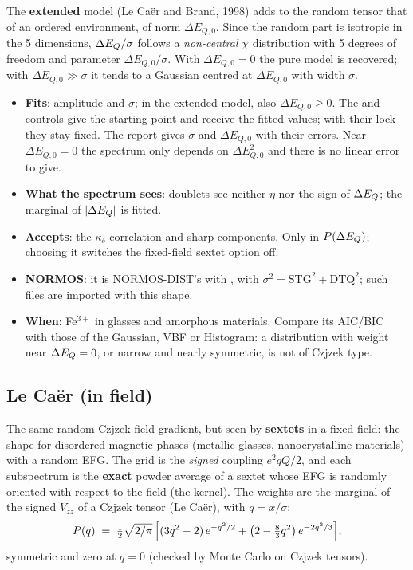 The \textbf{extended} model (Le Caër and Brand, 1998) adds to the random tensor
that of an ordered environment, of norm $\Delta E_{Q,0}$. Since the random part is
isotropic in the 5 dimensions, $\Delta E_{Q}/\sigma$ follows a \emph{non-central} $\chi$
distribution with 5 degrees of freedom and parameter $\Delta E_{Q,0}/\sigma$. With
$\Delta E_{Q,0}=0$ the pure model is recovered; with $\Delta E_{Q,0}\gg\sigma$ it tends to a
Gaussian centred at $\Delta E_{Q,0}$ with width $\sigma$.

\begin{itemize}[nosep]
  \item \textbf{Fits}: amplitude and $\sigma$; in the extended model, also
        $\Delta E_{Q,0}\ge 0$. The  and 
        controls give the starting point and receive the fitted values; with
        their lock they stay fixed. The report gives $\sigma$ and $\Delta E_{Q,0}$ with their
        errors. Near $\Delta E_{Q,0}=0$ the spectrum only depends on $\Delta E_{Q,0}^2$ and
        there is no linear error to give.
  \item \textbf{What the spectrum sees}: doublets see neither $\eta$ nor the
        sign of $\Delta E_{Q}$; the marginal of $|\Delta E_{Q}|$ is fitted.
  \item \textbf{Accepts}: the $\kappa_\delta$ correlation and sharp components.
        Only in $P(\Delta E_{Q})$; choosing it switches the fixed-field sextet option
        off.
  \item \textbf{NORMOS}: it is NORMOS-DIST's  with
        , with $\sigma^2=\mathrm{STG}^2+\mathrm{DTQ}^2$; such
         files are imported with this shape.
  \item \textbf{When}: Fe$^{3+}$ in glasses and amorphous materials. Compare its
        AIC/BIC with those of the Gaussian, VBF or Histogram: a distribution with
        weight near $\Delta E_{Q}=0$, or narrow and nearly symmetric, is not of Czjzek
        type.
\end{itemize}

\subsection{Le Caër (in field)}
\label{sec:forma-lecaer}

The same random Czjzek field gradient, but seen by \textbf{sextets} in a fixed
field: the shape for disordered magnetic phases (metallic glasses,
nanocrystalline materials) with a random EFG. The grid is the \emph{signed}
coupling $e^2qQ/2$, and each subspectrum is the \textbf{exact} powder average of
a sextet whose EFG is randomly oriented with respect to the field (the
 kernel). The weights are the marginal of the signed
$V_{zz}$ of a Czjzek tensor (Le Caër), with $q = x/\sigma$:
\[
  P(q) \;=\; \tfrac12\sqrt{2/\pi}\,\Bigl[(3q^{2}-2)\,e^{-q^{2}/2}
        + \bigl(2-\tfrac83 q^{2}\bigr)\,e^{-2q^{2}/3}\Bigr],
\]
symmetric and zero at $q=0$ (checked by Monte Carlo on Czjzek tensors).

